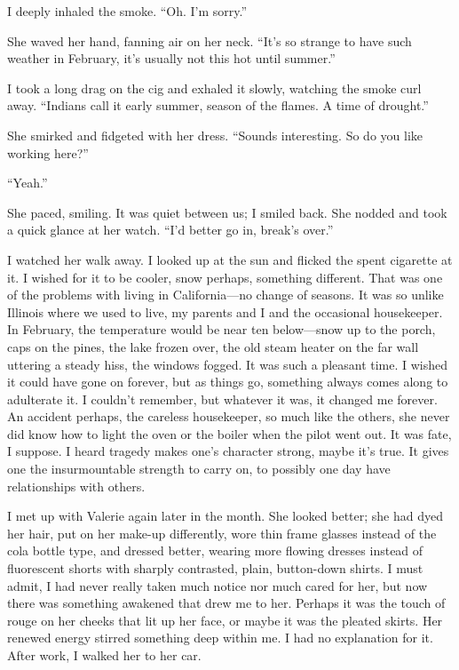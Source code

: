\documentclass[
]{article}
\begin{document}
I deeply inhaled the smoke. ``Oh. I'm sorry.''

She waved her hand, fanning air on her neck. ``It's so strange to have
such weather in February, it's usually not this hot until summer.''

I took a long drag on the cig and exhaled it slowly, watching the smoke
curl away. ``Indians call it early summer, season of the flames. A time
of drought.''

She smirked and fidgeted with her dress. ``Sounds interesting. So do you
like working here?''

``Yeah.''

She paced, smiling. It was quiet between us; I smiled back. She nodded
and took a quick glance at her watch. ``I'd better go in, break's
over.''

I watched her walk away. I looked up at the sun and flicked the spent
cigarette at it. I wished for it to be cooler, snow perhaps, something
different. That was one of the problems with living in California---no
change of seasons. It was so unlike Illinois where we used to live, my
parents and I and the occasional housekeeper. In February, the
temperature would be near ten below---snow up to the porch, caps on the
pines, the lake frozen over, the old steam heater on the far wall
uttering a steady hiss, the windows fogged. It was such a pleasant time.
I wished it could have gone on forever, but as things go, something
always comes along to adulterate it. I couldn't remember, but whatever
it was, it changed me forever. An accident perhaps, the careless
housekeeper, so much like the others, she never did know how to light
the oven or the boiler when the pilot went out. It was fate, I suppose.
I heard tragedy makes one's character strong, maybe it's true. It gives
one the insurmountable strength to carry on, to possibly one day have
relationships with others.

I met up with Valerie again later in the month. She looked better; she
had dyed her hair, put on her make-up differently, wore thin frame
glasses instead of the cola bottle type, and dressed better, wearing
more flowing dresses instead of fluorescent shorts with sharply
contrasted, plain, button-down shirts. I must admit, I had never really
taken much notice nor much cared for her, but now there was something
awakened that drew me to her. Perhaps it was the touch of rouge on her
cheeks that lit up her face, or maybe it was the pleated skirts. Her
renewed energy stirred something deep within me. I had no explanation
for it. After work, I walked her to her car.
\end{document}
